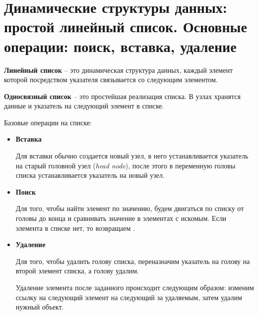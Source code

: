 \section{Динамические структуры данных: простой линейный список. Основные операции: поиск, вставка, удаление}
\textbf{Линейный список} -- это динамическая структура данных, каждый элемент которой посредством указателя связывается со следующим элементом.

\textbf{Односвязный список} -- это простейшая реализация списка. В узлах хранятся данные и указатель на следующий элемент в списке.

Базовые операции на списке:
\begin{itemize}
    \item
          \textbf{Вставка}

          Для вставки обычно создается новый узел, в него устанавливается указатель на старый головной узел (\textit{head node}), после этого в переменную головы списка устанавливается указатель на новый узел.
    \item
          \textbf{Поиск}

          Для того, чтобы найти элемент по значению, будем двигаться по списку от головы до конца и сравнивать значение в элементах с искомым. Если элемента в списке нет, то возвращаем .
    \item
          \textbf{Удаление}

          Для того, чтобы удалить голову списка, переназначим указатель на голову на второй элемент списка, а голову удалим.

          Удаление элемента после заданного происходит следующим образом: изменим ссылку на следующий элемент на следующий за удаляемым, затем удалим нужный объект.
\end{itemize}

